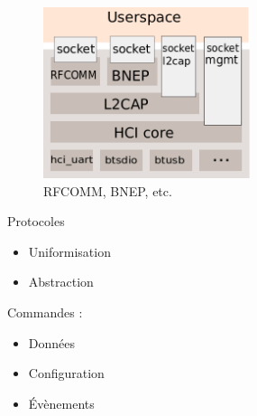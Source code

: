 \begin{frame}
\begin{minipage}[t]{0.60\linewidth}
	\begin{figure}
		\includegraphics[height=5cm]{bluez_kernel.png}
		\caption{RFCOMM, BNEP, etc.}
	\end{figure}
\end{minipage}
\begin{minipage}[t]{0.30\linewidth}
	\begin{block}{Protocoles}
		\begin{itemize}
			\item Uniformisation
			\item Abstraction
		\end{itemize}
		Commandes : 
		\begin{itemize}
			\item Données
			\item Configuration
			\item Évènements
		\end{itemize}
	\end{block}
\end{minipage}
\end{frame}


